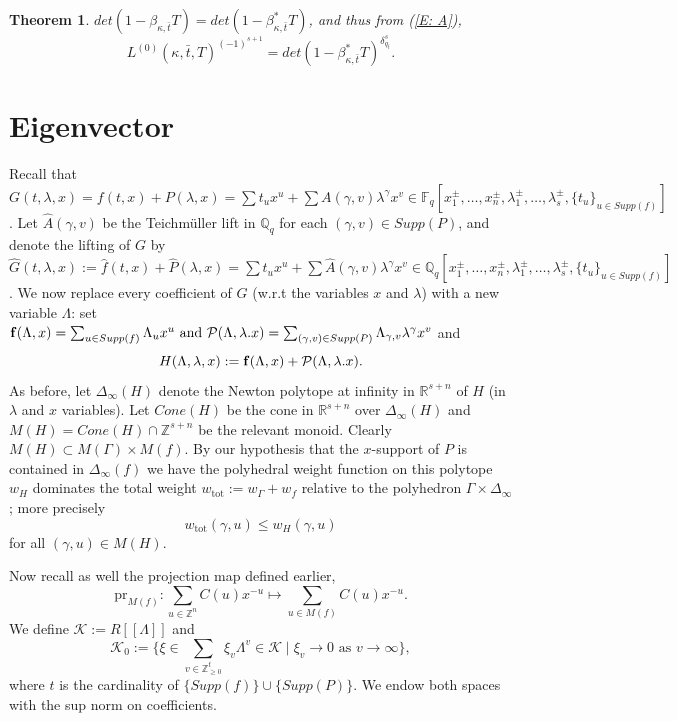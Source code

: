 \documentclass{article}
\newtheorem{theorem}{Theorem}[section]
\theoremstyle{remark}
\def\bb #1{ {\mathbb #1} }
\def\c #1{ {\mathcal #1} }
\def\b #1{ {\bf #1} }
\begin{document}
\begin{theorem}
$det(1 - \beta_{\kappa, \bar t} T) = det(1 - \beta_{\kappa, \bar t}^* T)$, and thus from (\ref{E: A}),
\begin{equation}\label{E: L0  and dual}
L^{(0)}(\kappa, \bar t, T)^{(-1)^{s+1}} = det(1 - \beta_{\kappa, \bar t}^* T)^{\delta_{q_{\bar t}}^{s}}.
\end{equation}
\end{theorem}






\section{Eigenvector}

Recall that $G(t, \lambda, x) = f(t, x) + P(\lambda, x) = \sum t_u x^u + \sum A(\gamma, v) \lambda^\gamma x^v \in \bb F_q[x_1^\pm, \ldots, x_n^\pm, \lambda_1^\pm, \ldots, \lambda_s^\pm, \{ t_u \}_{u \in Supp(f)}]$. Let  $\hat A(\gamma, v)$ be the Teichm\"uller lift in $\bb Q_q$ for each $(\gamma, v) \in Supp(P)$, and denote the lifting of $G$ by $\hat G(t, \lambda, x) := \hat f(t, x) + \hat P(\lambda, x) = \sum t_u x^u + \sum \hat A(\gamma, v) \lambda^\gamma x^v \in \bb Q_q[x_1^\pm, \ldots, x_n^\pm, \lambda_1^\pm, \ldots, \lambda_s^\pm, \{ t_u \}_{u \in Supp(f)}]$. We now replace every coefficient of $G$ (w.r.t the variables $x$ and $\lambda$) with a new variable $\Lambda$: set $ \b f(\Lambda,x)=\sum_{u \in Supp(f)} \Lambda_u x^u \ \text{and} \ \c P(\Lambda, \lambda. x) = \sum_{(\gamma, v) \in Supp(P)} \Lambda_{\gamma, v} \lambda^\gamma x^v$ and
\[
H(\Lambda, \lambda, x) := \b f(\Lambda,x)  +  \c P(\Lambda, \lambda. x) .
\]
As before, let $\Delta_{\infty}(H)$ denote the Newton polytope at infinity in $\bb R^{s+n}$ of $H$ (in $\lambda$ and $x$ variables). Let $Cone(H)$ be the cone in $\bb R^{s+n}$ over $\Delta_{\infty}(H)$ and $M(H) = Cone(H) \cap \bb Z^{s+n}$ be the relevant monoid. Clearly $M(H) \subset M(\Gamma) \times M(f)$. By our hypothesis that the $x$-support of $P$ is contained in $\Delta_{\infty}(f)$ we have the polyhedral weight function on this polytope $w_H$ dominates the total weight $w_{\text{tot}} := w_{\Gamma} + w_f$ relative to the polyhedron $\Gamma \times \Delta_{\infty}$; more precisely 
\[
w_{\text{tot}}(\gamma, u) \leq w_H(\gamma, u)
\]
for all $(\gamma, u) \in M(H)$.

Now recall as well the projection map defined earlier,
\[
\text{pr}_{M(f)}: \sum_{u \in \bb Z^n} C(u) x^{-u} \longmapsto \sum_{u \in M(f)} C(u) x^{-u}.
\]
We define $\c K := R[[\Lambda]]$ and 
\[
\c K_0 := \{ \xi \in \sum_{v \in \bb Z_{\geq 0}^t} \xi_v \Lambda^v \in \c K \mid \xi_v \rightarrow 0 \text{ as } v \rightarrow \infty \},
\]
where $t$ is the cardinality of $\{ Supp(f) \} \cup \{ Supp(P) \}$. 
We endow both spaces with the sup norm on coefficients.
\end{document}
